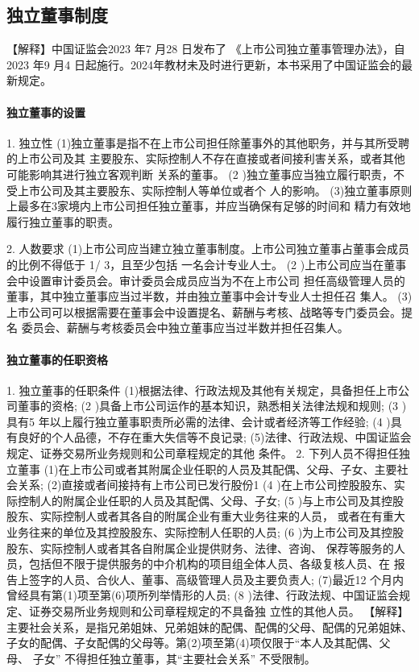 \documentclass[UTF8,12pt]{ctexart}
\numberwithin{equation}{section} %
\numberwithin{figure}{section}
\numberwithin{table}{section}
\begin{document}
	\subsection{独立董事制度}
	【解释】中国证监会2023 年7 月28 日发布了 《上市公司独立董事管理办法》，自 2023 年9 月4 日起施行。2024年教材未及时进行更新，本书采用了中国证监会的最新规定。
	
	\paragraph{独立董事的设置}
	1. 独立性 (1)独立董事是指不在上市公司担任除董事外的其他职务，并与其所受聘的上市公司及其 主要股东、实际控制人不存在直接或者间接利害关系，或者其他可能影响其进行独立客观判断 关系的董事。
	(2 )独立董事应当独立履行职责，不受上市公司及其主要股东、实际控制人等单位或者个 人的影响。 (3)独立董事原则上最多在3家境内上市公司担任独立董事，并应当确保有足够的时间和 精力有效地履行独立董事的职责。
	
	
	2. 人数要求 (1)上市公司应当建立独立董事制度。上市公司独立董事占董事会成员的比例不得低于 1/ 3，且至少包括 一名会计专业人士。
	(2 )上市公司应当在董事会中设置审计委员会。审计委员会成员应当为不在上市公司 担任高级管理人员的董事，其中独立董事应当过半数，并由独立董事中会计专业人士担任召 集人。 (3)上市公司可以根据需要在董事会中设置提名、薪酬与考核、战略等专门委员会。提名 委员会、薪酬与考核委员会中独立董事应当过半数并担任召集人。
	
	
	\paragraph{独立董事的任职资格}
	1. 独立董事的任职条件 (1)根据法律、行政法规及其他有关规定，具备担任上市公司董事的资格;
	(2 )具备上市公司运作的基本知识，熟悉相关法律法规和规则;
	(3 )具有5 年以上履行独立董事职责所必需的法律、会计或者经济等工作经验;
	(4 )具有良好的个人品德，不存在重大失信等不良记录; (5)法律、行政法规、中国证监会规定、证券交易所业务规则和公司章程规定的其他 条件。
	2. 下列人员不得担任独立董事 (1)在上市公司或者其附属企业任职的人员及其配偶、父母、子女、主要社会关系; (2)直接或者间接持有上市公司已发行股份1%
	(4 )在上市公司控股股东、实际控制人的附属企业任职的人员及其配偶、父母、子女; (5 )与上市公司及其控股股东、实际控制人或者其各自的附属企业有重大业务往来的人员， 或者在有重大业务往来的单位及其控股股东、实际控制人任职的人员;
	(6 )为上市公司及其控股股东、实际控制人或者其各自附属企业提供财务、法律、咨询、 保荐等服务的人员，包括但不限于提供服务的中介机构的项目组全体人员、各级复核人员、在 报告上签字的人员、合伙人、董事、高级管理人员及主要负责人;
	(7)最近12 个月内曾经具有第(1)项至第(6)项所列举情形的人员;
	(8 )法律、行政法规、中国证监会规定、证券交易所业务规则和公司章程规定的不具备独 立性的其他人员。
	【解释】主要社会关系，是指兄弟姐妹、兄弟姐妹的配偶、配偶的父母、配偶的兄弟姐妹、 子女的配偶、子女配偶的父母等。第(2)项至第(4)项仅限于“本人及其配偶、父母、 子女” 不得担任独立董事，其“主要社会关系” 不受限制。
	
\end{document}
